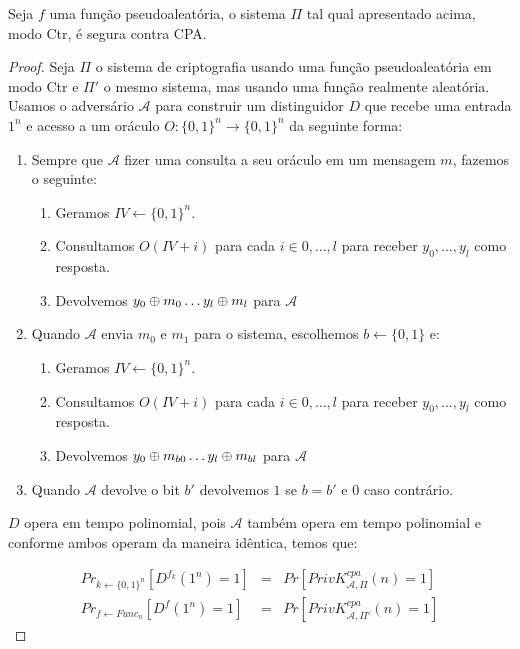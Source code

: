 \begin{theorem}
  Seja $f$ uma função pseudoaleatória, o sistema $\Pi$ tal qual apresentado acima, modo Ctr, é segura contra CPA.
\end{theorem}
\begin{proof}
  Seja $\Pi$ o sistema de criptografia usando uma função pseudoaleatória em modo Ctr e $\Pi'$ o mesmo sistema, mas usando uma função realmente aleatória.
Usamos o adversário $\mathcal{A}$ para construir um distinguidor $D$ que recebe uma entrada $1^n$ e acesso a um oráculo $O:\{0,1\}^n \to \{0,1\}^n$ da seguinte forma:
\begin{enumerate}
\item Sempre que $\mathcal{A}$ fizer uma consulta a seu oráculo em um mensagem $m$, fazemos o seguinte:
\begin{enumerate}
\item Geramos $IV \leftarrow \{0,1\}^n$.
\item Consultamos $O(IV + i)$ para cada $i \in 0, \dots, l$ para receber $y_0, \dots, y_l$ como resposta.
\item Devolvemos $y_0 \oplus m_0 \dots y_l \oplus m_l$ para $\mathcal{A}$
\end{enumerate}
\item Quando $\mathcal{A}$ envia $m_0$ e $m_1$ para o sistema, escolhemos $b \leftarrow \{0,1\}$ e:
\begin{enumerate}
\item Geramos $IV \leftarrow \{0,1\}^n$.
\item Consultamos $O(IV + i)$ para cada $i \in 0, \dots, l$ para receber $y_0, \dots, y_l$ como resposta.
\item Devolvemos $y_0 \oplus m_{b0} \dots y_l \oplus m_{bl}$ para $\mathcal{A}$
\end{enumerate}
\item Quando $\mathcal{A}$ devolve o bit $b'$ devolvemos $1$ se $b = b'$ e $0$ caso contrário.
\end{enumerate}

$D$ opera em tempo polinomial, pois $\mathcal{A}$ também opera em tempo polinomial e conforme ambos operam da maneira idêntica, temos que:

\begin{eqnarray*}
  Pr_{k \leftarrow \{0,1\}^n}[D^{f_k}(1^n) = 1] & = & Pr[PrivK^{cpa}_{\mathcal{A},\Pi}(n) = 1]\\
  Pr_{f \leftarrow Func_n}[D^{f}(1^n) = 1] & = & Pr[PrivK^{cpa}_{\mathcal{A},\Pi'}(n) = 1]
\end{eqnarray*}
 

\end{proof}
